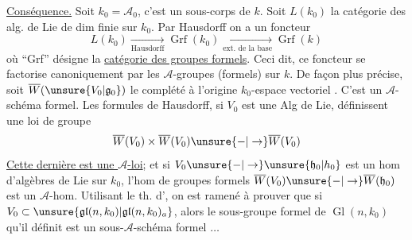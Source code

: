 \uline{Conséquence.} Soit $k_0=\mathcal A_0$, c'est un sous-corps de $k$. Soit $L(k_0)$ la catégorie des alg. de Lie de dim finie sur $k_0$. Par Hausdorff on a un foncteur
\[
L(k_0)\xrightarrow[\text{Hausdorff}]{}\operatorname{Grf}(k_0)\xrightarrow[\text{ext. de la base}]{}\operatorname{Grf}(k)
\]
où ``Grf'' désigne la \uline{catégorie des groupes formels}.
Ceci dit, ce foncteur se factorise canoniquement par les $\mathcal A$-groupes (formels) sur $k$. De façon plus précise, soit $\overline W(\unsure{V_0|\mathfrak g_0})$ le complété à l'origine  $k_0$-espace vectoriel . C'est un $\mathcal A$-schéma formel.
Les formules de Hausdorff, si $V_0$ est une Alg de Lie, définissent une loi de groupe
\[
\overline W(V_0)\times\overline W(V_0)\unsure{-|\to}\overline W(V_0)
\]
\uline{Cette dernière est une $\mathcal A$-loi};  et si
$V_0\unsure{-|\to}\unsure{\mathfrak h_0|h_0}$ est un hom d'algèbres de Lie sur $k_0$, l'hom de groupes formels $\overline W(V_0)\unsure{-|\to}\overline W(\mathfrak h_0)$ est un $\mathcal A$-hom.
Utilisant le th. d', on est ramené à prouver que si $V_0\subset\unsure{\mathfrak{gl}(n,k_0)|\mathfrak{gl}(n,k_0)_a}$, alors le sous-groupe formel de $\operatorname{Gl}(n,k_0)$ qu'il définit est un sous-$\mathcal A$-schéma formel $\ldots$
\margin{$-$}
